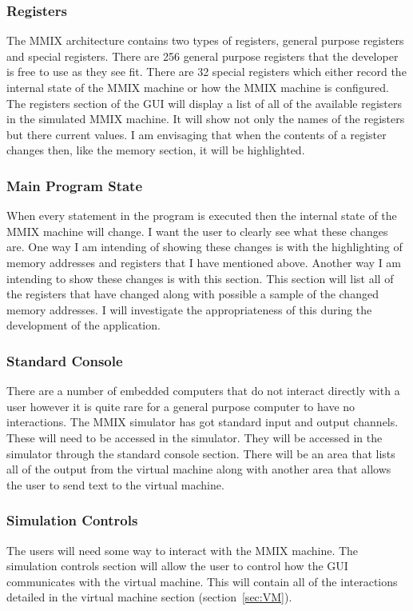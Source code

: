 \documentclass[11pt]{article} %
\begin{document}
\subsubsection{Registers}
The MMIX architecture contains two types of registers, general purpose registers and special registers.  There are 256 general purpose registers that the developer is free to use as they see fit. There are 32 special registers which either record the internal state of the MMIX machine or how the MMIX machine is configured. The registers section of the GUI will display a list of all of the available registers in the simulated MMIX machine.  It will show not only the names of the registers but there current values.  I am envisaging that when the contents of a register changes then, like the memory section, it will be highlighted.
\subsubsection{Main Program State}
When every statement in the program is executed then the internal state of the MMIX machine will change.  I want the user to clearly see what these changes are.  One way I am intending of showing these changes is with the highlighting of memory addresses and registers that I have mentioned above.  Another way I am intending to show these changes is with this section.  This section will list all of the registers that have changed along with possible a sample of the changed memory addresses. I will investigate the appropriateness of this during the development of the application.
\subsubsection{Standard Console}
There are a number of embedded computers that do not interact directly with a user however it is quite rare for a general purpose computer to have no interactions.  The MMIX simulator has got standard input and output channels.  These will need to be accessed in the simulator.  They will be accessed in the simulator through the standard console section. There will be an area that lists all of the output from the virtual machine along with another area that allows the user to send text to the virtual machine.
\subsubsection{Simulation Controls}
The users will need some way to interact with the MMIX machine.  The simulation controls section will allow the user to control how the GUI communicates with the virtual machine. This will contain all of the interactions detailed in the virtual machine section (section~\ref{sec:VM}). 
\end{document}

